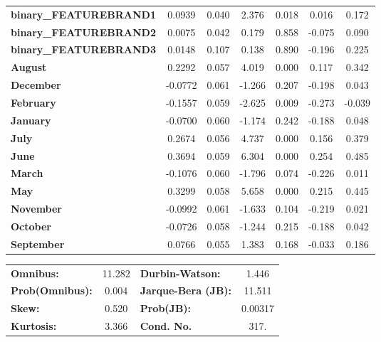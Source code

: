 \documentclass[a4paper,11pt]{article}
\begin{document}
\begin{center}
\begin{tabular}{lcccccc}
\textbf{binary\_FEATUREBRAND1} &       0.0939  &        0.040     &     2.376  &         0.018        &        0.016    &        0.172     \\
\textbf{binary\_FEATUREBRAND2} &       0.0075  &        0.042     &     0.179  &         0.858        &       -0.075    &        0.090     \\
\textbf{binary\_FEATUREBRAND3} &       0.0148  &        0.107     &     0.138  &         0.890        &       -0.196    &        0.225     \\
\textbf{August}                &       0.2292  &        0.057     &     4.019  &         0.000        &        0.117    &        0.342     \\
\textbf{December}              &      -0.0772  &        0.061     &    -1.266  &         0.207        &       -0.198    &        0.043     \\
\textbf{February}              &      -0.1557  &        0.059     &    -2.625  &         0.009        &       -0.273    &       -0.039     \\
\textbf{January}               &      -0.0700  &        0.060     &    -1.174  &         0.242        &       -0.188    &        0.048     \\
\textbf{July}                  &       0.2674  &        0.056     &     4.737  &         0.000        &        0.156    &        0.379     \\
\textbf{June}                  &       0.3694  &        0.059     &     6.304  &         0.000        &        0.254    &        0.485     \\
\textbf{March}                 &      -0.1076  &        0.060     &    -1.796  &         0.074        &       -0.226    &        0.011     \\
\textbf{May}                   &       0.3299  &        0.058     &     5.658  &         0.000        &        0.215    &        0.445     \\
\textbf{November}              &      -0.0992  &        0.061     &    -1.633  &         0.104        &       -0.219    &        0.021     \\
\textbf{October}               &      -0.0726  &        0.058     &    -1.244  &         0.215        &       -0.188    &        0.042     \\
\textbf{September}             &       0.0766  &        0.055     &     1.383  &         0.168        &       -0.033    &        0.186     \\
\bottomrule
\end{tabular}
\begin{tabular}{lclc}
\textbf{Omnibus:}       & 11.282 & \textbf{  Durbin-Watson:     } &    1.446  \\
\textbf{Prob(Omnibus):} &  0.004 & \textbf{  Jarque-Bera (JB):  } &   11.511  \\
\textbf{Skew:}          &  0.520 & \textbf{  Prob(JB):          } &  0.00317  \\
\textbf{Kurtosis:}      &  3.366 & \textbf{  Cond. No.          } &     317.  \\
\bottomrule
\end{tabular}
\end{center}
\newpage
\end{document}
